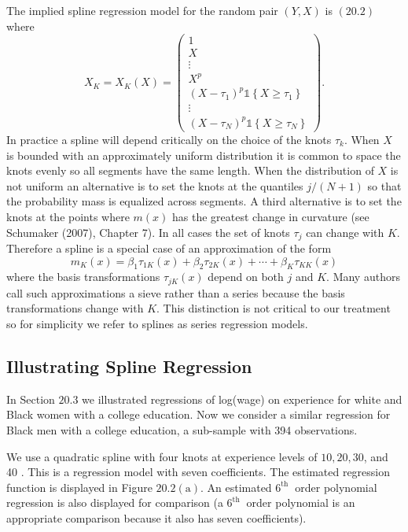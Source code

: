 \documentclass[10pt]{article}
\begin{document}
The implied spline regression model for the random pair $(Y, X)$ is $(20.2)$ where
$$
X_{K}=X_{K}(X)=\left(\begin{array}{c}
1 \\
X \\
\vdots \\
X^{p} \\
\left(X-\tau_{1}\right)^{p} \mathbb{1}\left\{X \geq \tau_{1}\right\} \\
\vdots \\
\left(X-\tau_{N}\right)^{p} \mathbb{1}\left\{X \geq \tau_{N}\right\}
\end{array}\right) .
$$
In practice a spline will depend critically on the choice of the knots $\tau_{k}$. When $X$ is bounded with an approximately uniform distribution it is common to space the knots evenly so all segments have the same length. When the distribution of $X$ is not uniform an alternative is to set the knots at the quantiles $j /(N+1)$ so that the probability mass is equalized across segments. A third alternative is to set the knots at the points where $m(x)$ has the greatest change in curvature (see Schumaker (2007), Chapter 7). In all cases the set of knots $\tau_{j}$ can change with $K$. Therefore a spline is a special case of an approximation of the form
$$
m_{K}(x)=\beta_{1} \tau_{1 K}(x)+\beta_{2} \tau_{2 K}(x)+\cdots+\beta_{K} \tau_{K K}(x)
$$
where the basis transformations $\tau_{j K}(x)$ depend on both $j$ and $K$. Many authors call such approximations a sieve rather than a series because the basis transformations change with $K$. This distinction is not critical to our treatment so for simplicity we refer to splines as series regression models.

\subsection{Illustrating Spline Regression}
In Section $20.3$ we illustrated regressions of log(wage) on experience for white and Black women with a college education. Now we consider a similar regression for Black men with a college education, a sub-sample with 394 observations.

We use a quadratic spline with four knots at experience levels of $10,20,30$, and 40 . This is a regression model with seven coefficients. The estimated regression function is displayed in Figure $20.2(\mathrm{a})$. An estimated $6^{\text {th }}$ order polynomial regression is also displayed for comparison (a $6^{\text {th }}$ order polynomial is an appropriate comparison because it also has seven coefficients).
\end{document}
